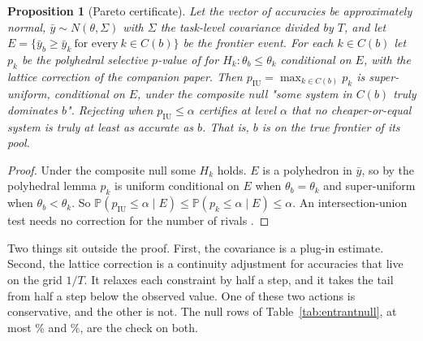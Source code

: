 \documentclass[11pt]{article}
\renewcommand{\Pr}{\mathbb{P}}
\newtheorem{proposition}{Proposition}
\begin{document}
\begin{proposition}[Pareto certificate]
\label{prop:pareto}
Let the vector of accuracies be approximately normal, $\bar y\sim N(\theta,\Sigma)$ with $\Sigma$ the task-level covariance divided by $T$, and let $E=\{\bar y_b\ge\bar y_k\ \text{for every}\ k\in C(b)\}$ be the frontier event. For each $k\in C(b)$ let $p_k$ be the polyhedral selective $p$-value of \citet{lee2016exact} for $H_k:\theta_b\le\theta_k$ conditional on $E$, with the lattice correction of the companion paper. Then $p_{\mathrm{IU}}=\max_{k\in C(b)}p_k$ is super-uniform, conditional on $E$, under the composite null "some system in $C(b)$ truly dominates $b$". Rejecting when $p_{\mathrm{IU}}\le\alpha$ certifies at level $\alpha$ that no cheaper-or-equal system is truly at least as accurate as $b$. That is, $b$ is on the true frontier of its pool.
\end{proposition}
\begin{proof}
Under the composite null some $H_k$ holds. $E$ is a polyhedron in $\bar y$, so by the polyhedral lemma $p_k$ is uniform conditional on $E$ when $\theta_b=\theta_k$ and super-uniform when $\theta_b<\theta_k$. So $\Pr(p_{\mathrm{IU}}\le\alpha\mid E)\le\Pr(p_k\le\alpha\mid E)\le\alpha$. An intersection-union test needs no correction for the number of rivals \citep{berger1982iu}.
\end{proof}
Two things sit outside the proof. First, the covariance is a plug-in estimate. Second, the lattice correction is a continuity adjustment for accuracies that live on the grid $1/T$. It relaxes each constraint by half a step, and it takes the tail from half a step below the observed value. One of these two actions is conservative, and the other is not. The null rows of Table~\ref{tab:entrantnull}, at most \NumEntrantNullIUCopyMax\% and \NumEntrantNullIUIndepMax\%, are the check on both.
\end{document}
